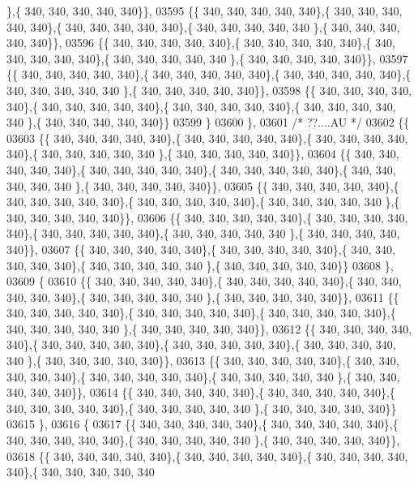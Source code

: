 \begin{DoxyCode}
      \},\{ 340, 340, 340, 340, 340\}\},
03595 \{\{ 340, 340, 340, 340, 340\},\{ 340, 340, 340, 340, 340\},\{ 340, 340, 340, 340, 340\},\{ 340, 340, 340, 340, 340
      \},\{ 340, 340, 340, 340, 340\}\},
03596 \{\{ 340, 340, 340, 340, 340\},\{ 340, 340, 340, 340, 340\},\{ 340, 340, 340, 340, 340\},\{ 340, 340, 340, 340, 340
      \},\{ 340, 340, 340, 340, 340\}\},
03597 \{\{ 340, 340, 340, 340, 340\},\{ 340, 340, 340, 340, 340\},\{ 340, 340, 340, 340, 340\},\{ 340, 340, 340, 340, 340
      \},\{ 340, 340, 340, 340, 340\}\},
03598 \{\{ 340, 340, 340, 340, 340\},\{ 340, 340, 340, 340, 340\},\{ 340, 340, 340, 340, 340\},\{ 340, 340, 340, 340, 340
      \},\{ 340, 340, 340, 340, 340\}\}
03599 \}
03600 \},
03601 \textcolor{comment}{/* ??....AU */}
03602 \{\{
03603 \{\{ 340, 340, 340, 340, 340\},\{ 340, 340, 340, 340, 340\},\{ 340, 340, 340, 340, 340\},\{ 340, 340, 340, 340, 340
      \},\{ 340, 340, 340, 340, 340\}\},
03604 \{\{ 340, 340, 340, 340, 340\},\{ 340, 340, 340, 340, 340\},\{ 340, 340, 340, 340, 340\},\{ 340, 340, 340, 340, 340
      \},\{ 340, 340, 340, 340, 340\}\},
03605 \{\{ 340, 340, 340, 340, 340\},\{ 340, 340, 340, 340, 340\},\{ 340, 340, 340, 340, 340\},\{ 340, 340, 340, 340, 340
      \},\{ 340, 340, 340, 340, 340\}\},
03606 \{\{ 340, 340, 340, 340, 340\},\{ 340, 340, 340, 340, 340\},\{ 340, 340, 340, 340, 340\},\{ 340, 340, 340, 340, 340
      \},\{ 340, 340, 340, 340, 340\}\},
03607 \{\{ 340, 340, 340, 340, 340\},\{ 340, 340, 340, 340, 340\},\{ 340, 340, 340, 340, 340\},\{ 340, 340, 340, 340, 340
      \},\{ 340, 340, 340, 340, 340\}\}
03608 \},
03609 \{
03610 \{\{ 340, 340, 340, 340, 340\},\{ 340, 340, 340, 340, 340\},\{ 340, 340, 340, 340, 340\},\{ 340, 340, 340, 340, 340
      \},\{ 340, 340, 340, 340, 340\}\},
03611 \{\{ 340, 340, 340, 340, 340\},\{ 340, 340, 340, 340, 340\},\{ 340, 340, 340, 340, 340\},\{ 340, 340, 340, 340, 340
      \},\{ 340, 340, 340, 340, 340\}\},
03612 \{\{ 340, 340, 340, 340, 340\},\{ 340, 340, 340, 340, 340\},\{ 340, 340, 340, 340, 340\},\{ 340, 340, 340, 340, 340
      \},\{ 340, 340, 340, 340, 340\}\},
03613 \{\{ 340, 340, 340, 340, 340\},\{ 340, 340, 340, 340, 340\},\{ 340, 340, 340, 340, 340\},\{ 340, 340, 340, 340, 340
      \},\{ 340, 340, 340, 340, 340\}\},
03614 \{\{ 340, 340, 340, 340, 340\},\{ 340, 340, 340, 340, 340\},\{ 340, 340, 340, 340, 340\},\{ 340, 340, 340, 340, 340
      \},\{ 340, 340, 340, 340, 340\}\}
03615 \},
03616 \{
03617 \{\{ 340, 340, 340, 340, 340\},\{ 340, 340, 340, 340, 340\},\{ 340, 340, 340, 340, 340\},\{ 340, 340, 340, 340, 340
      \},\{ 340, 340, 340, 340, 340\}\},
03618 \{\{ 340, 340, 340, 340, 340\},\{ 340, 340, 340, 340, 340\},\{ 340, 340, 340, 340, 340\},\{ 340, 340, 340, 340, 340

\end{DoxyCode}
